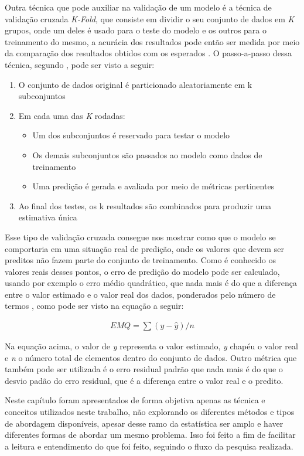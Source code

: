 Outra técnica que pode auxiliar na validação de um modelo é a técnica de
validação cruzada \textit{K-Fold}, que consiste em dividir o seu conjunto de
dados em \textit{K} grupos, onde um deles é usado para o teste do modelo e
os outros para o treinamento do mesmo, a acurácia dos resultados pode então ser
medida por meio da comparação dos resultados obtidos com os esperados
\cite{tassia:2011}. O passo-a-passo dessa técnica, segundo
, pode ser visto a seguir:

\begin{enumerate}
  \item O conjunto de dados original é particionado aleatoriamente em k
    subconjuntos
  \item Em cada uma das \textit{K} rodadas:
    \begin{itemize}
      \item Um dos subconjuntos é reservado para testar o modelo
      \item Os demais subconjuntos são passados ao modelo como dados de treinamento
      \item Uma predição é gerada e avaliada por meio de métricas pertinentes
    \end{itemize}
  \item Ao final dos testes, os k resultados são combinados para produzir uma
    estimativa única
\end{enumerate}

Esse tipo de validação cruzada consegue nos mostrar como que o modelo se
comportaria em uma situação real de predição, onde os valores que devem ser
preditos não fazem parte do conjunto de treinamento. Como é conhecido os valores
reais desses pontos, o erro de predição do modelo pode ser calculado, usando por
exemplo o erro médio quadrático, que nada mais é do que a diferença entre o
valor estimado e o valor real dos dados, ponderados pelo número de termos
\cite{caetano:2012}, como pode ser visto na equação a seguir:

\begin{align*}
  EMQ = \sum (y - \hat{y}) / n
\end{align*}

Na equação acima, o valor de \textit{y} representa o valor estimado,
\textit{y} chapéu o valor real e \textit{n} o número total de elementos dentro do
conjunto de dados. Outro métrica que também pode ser utilizada é o erro residual
padrão que nada mais é do que o desvio padão do erro residual, que é a diferença
entre o valor real e o predito.



Neste capítulo foram apresentados de forma objetiva apenas as técnica e
conceitos utilizados neste trabalho, não explorando os diferentes métodos e tipos de
abordagem disponíveis, apesar desse ramo da estatística ser amplo e haver diferentes formas
de abordar um mesmo problema. Isso foi feito a fim de facilitar a leitura e
entendimento do que foi feito, seguindo o fluxo da pesquisa realizada.
